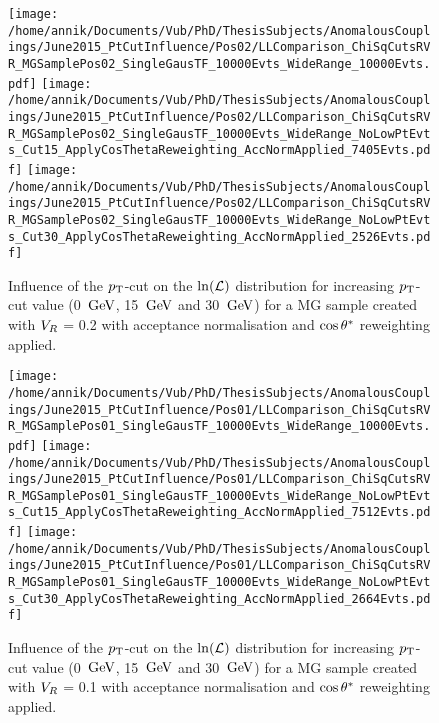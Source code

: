 \begin{figure}[h!t]
 \centering
 \texttt{[image: /home/annik/Documents/Vub/PhD/ThesisSubjects/AnomalousCouplings/June2015\_PtCutInfluence/Pos02/LLComparison\_ChiSqCutsRVR\_MGSamplePos02\_SingleGausTF\_10000Evts\_WideRange\_10000Evts.pdf]}
 \texttt{[image: /home/annik/Documents/Vub/PhD/ThesisSubjects/AnomalousCouplings/June2015\_PtCutInfluence/Pos02/LLComparison\_ChiSqCutsRVR\_MGSamplePos02\_SingleGausTF\_10000Evts\_WideRange\_NoLowPtEvts\_Cut15\_ApplyCosThetaReweighting\_AccNormApplied\_7405Evts.pdf]}
 \texttt{[image: /home/annik/Documents/Vub/PhD/ThesisSubjects/AnomalousCouplings/June2015\_PtCutInfluence/Pos02/LLComparison\_ChiSqCutsRVR\_MGSamplePos02\_SingleGausTF\_10000Evts\_WideRange\_NoLowPtEvts\_Cut30\_ApplyCosThetaReweighting\_AccNormApplied\_2526Evts.pdf]}
 \caption{Influence of the $p_{\textrm T}$-cut on the $\ln(\mathcal{L})$ distribution for increasing $p_{\textrm T}$-cut value (0 $\, \mathrm{GeV}$, 15 $\, \mathrm{GeV}$ and 30 $\, \mathrm{GeV}$) for a MG sample created with $V_{R}$ = 0.2 with acceptance normalisation and $\cos \theta^{*}$ reweighting applied.}
 \label{fig::AccNormCosPos02}
\end{figure}

\begin{figure}[h!t]
 \centering
 \texttt{[image: /home/annik/Documents/Vub/PhD/ThesisSubjects/AnomalousCouplings/June2015\_PtCutInfluence/Pos01/LLComparison\_ChiSqCutsRVR\_MGSamplePos01\_SingleGausTF\_10000Evts\_WideRange\_10000Evts.pdf]}
 \texttt{[image: /home/annik/Documents/Vub/PhD/ThesisSubjects/AnomalousCouplings/June2015\_PtCutInfluence/Pos01/LLComparison\_ChiSqCutsRVR\_MGSamplePos01\_SingleGausTF\_10000Evts\_WideRange\_NoLowPtEvts\_Cut15\_ApplyCosThetaReweighting\_AccNormApplied\_7512Evts.pdf]}
 \texttt{[image: /home/annik/Documents/Vub/PhD/ThesisSubjects/AnomalousCouplings/June2015\_PtCutInfluence/Pos01/LLComparison\_ChiSqCutsRVR\_MGSamplePos01\_SingleGausTF\_10000Evts\_WideRange\_NoLowPtEvts\_Cut30\_ApplyCosThetaReweighting\_AccNormApplied\_2664Evts.pdf]}
 \caption{Influence of the $p_{\textrm T}$-cut on the $\ln(\mathcal{L})$ distribution for increasing $p_{\textrm T}$-cut value (0 $\, \mathrm{GeV}$, 15 $\, \mathrm{GeV}$ and 30 $\, \mathrm{GeV}$) for a MG sample created with $V_{R}$ = 0.1 with acceptance normalisation and $\cos \theta^{*}$ reweighting applied.}
 \label{fig::AccNormCosPos01}
\end{figure}

